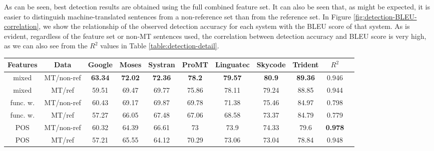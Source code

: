 \documentclass[11pt]{article}
\begin{document}
As can be seen, best detection results are obtained using the full combined feature set. It can also be seen that, as might be expected, it is easier to distinguish machine-translated sentences from a non-reference set than from the reference set. In Figure \ref{fig:detection-BLEU-correlation}, we show the relationship of the observed detection accuracy for each system with the BLEU score of that system. As is evident, regardless of the feature set or non-MT sentences used, the correlation between detection accuracy and BLEU score is very high, as we can also see from the $R^2$ values in Table \ref{table:detection-detail}. 

\begin{table*}[ht]
\centering  %
\begin{tabular}{c c c c c c c c c c c} %
\hline\hline                        %
Features & Data & Google & Moses & Systran & ProMT & Linguatec & Skycode & Trident & $R^2$ \\ [0.5ex] %
\hline %
mixed & MT/non-ref & \textbf{63.34} & \textbf{72.02} & \textbf{72.36} & \textbf{78.2} & \textbf{79.57} & \textbf{80.9} & \textbf{89.36} & 0.946 \\
mixed & MT/ref & 59.51 & 69.47 & 69.77 & 75.86 & 78.11 & 79.24 & 88.85 & 0.944 \\
func. w. & MT/non-ref & 60.43 & 69.17 & 69.87 & 69.78 & 71.38 & 75.46 & 84.97 & 0.798 \\
func. w. & MT/ref & 57.27 & 66.05 & 67.48 & 67.06 & 68.58 & 73.37 & 84.79 & 0.779 \\
POS & MT/non-ref & 60.32 & 64.39 & 66.61 & 73 & 73.9 & 74.33 & 79.6 & \textbf{0.978} \\
POS & MT/ref & 57.21 & 65.55 & 64.12 & 70.29 & 73.06 & 73.04 & 78.84 & 0.948 \\

\hline %
\end{tabular}
\caption{Classifier performance, including the $R^2$ coefficient describing the correlation with BLEU. } %
\label{table:detection-detail} %
\end{table*}
\end{document}
